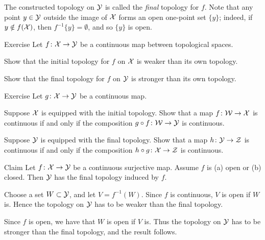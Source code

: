 The constructed topology on $\mathcal{Y}$ is called the \emph{final} topology for $f$.
Note that any point $y\in \mathcal{Y}$ outside the image of $\mathcal{X}$ forms an open one-point set $\{y\}$;
indeed, if $y\notin f(\mathcal{X})$, then $f^{-1}\{y\}=\emptyset$, and so $\{y\}$ is open.

\begin{thm}{Exercise}\label{ex:pullback/pushforward}
Let $f\colon\mathcal{X}\to\mathcal{Y}$ be a continuous map between topological spaces.

\begin{subthm}{}
Show that the initial topology for $f$ on $\mathcal{X}$ is weaker than its own topology.
\end{subthm}

\begin{subthm}{}
Show that the final topology for $f$ on $\mathcal{Y}$ is stronger than its own topology.
\end{subthm}

\end{thm}

\begin{thm}{Exercise}\label{ex:category-def-pull-push}
Let $g\colon\mathcal{X}\to\mathcal{Y}$ be a continuous map.

\begin{subthm}{}
Suppose $\mathcal{X}$ is equipped with the initial topology.
Show that a map $f\colon\mathcal{W}\to\mathcal{X}$ is continuous if and only if the composition $g\circ f\colon\mathcal{W}\to\mathcal{Y}$ is continuous.
\end{subthm}

\begin{subthm}{}
Suppose $\mathcal{Y}$ is equipped with the final topology.
Show that a map $h\colon\mathcal{Y}\to\mathcal{Z}$ is continuous if and only if the composition $h\circ g\:\c{X}\z\to\c{Z}$ is continuous.
\end{subthm}

\end{thm}

\begin{thm}{Claim}\label{ex:open-closed-pushforward}
Let $f\colon\mathcal{X}\to \mathcal{Y}$ be a continuous surjective map.
Assume $f$ is (a) open or (b) closed.
Then $\mathcal{Y}$ has the final topology induced by $f$.
\end{thm}

Choose a set $W\subset \mathcal{Y}$, and let $V=f^{-1}(W)$.
Since $f$ is continuous, $V$ is open if $W$ is.
Hence the topology on $\mathcal{Y}$ has to be weaker than the final topology.

Since $f$ is open, we have that $W$ is open if $V$ is.
Thus the topology on $\mathcal{Y}$ has to be stronger than the final topology, and the result follows.

